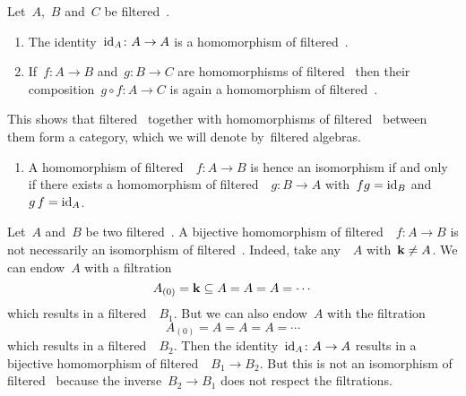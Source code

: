 \begin{remark}
  Let~$A$,~$B$ and~$C$ be filtered~\algebras{$\kf$}.
  \begin{enumerate}
    \item
      The identity~$\operatorname{id}_A \colon A \to A$ is a homomorphism of filtered~\algebras{$\kf$}.
    \item
      If~$f \colon A \to B$ and~$g \colon B \to C$ are homomorphisms of filtered~\algebras{$\kf$} then their composition~$g \circ f \colon A \to C$ is again a homomorphism of filtered~\algebras{$\kf$}.
  \end{enumerate}
  This shows that filtered~\algebras{$\kf$} together with homomorphisms of filtered~\algebras{$\kf$} between them form a category, which we will denote by~\gls*{filtered algebras}.
  \begin{enumerate}[resume]
    \item
      A homomorphism of filtered~{\algebras{$\kf$}}~$f \colon A \to B$ is hence an isomorphism if and only if there exists a homomorphism of filtered~{\algebras{$\kf$}}~$g \colon B \to A$ with~$f {} g = \operatorname{id}_B$ and~$g \, f = \operatorname{id}_A$.
  \end{enumerate}
\end{remark}


\begin{warning}
  Let~$A$ and~$B$ be two filtered~{\algebras{$\kf$}}.
  A bijective homomorphism of filtered~{\algebras{$\kf$}}~$f \colon A \to B$ is not necessarily an isomorphism of filtered~{\algebras{$\kf$}}.
  Indeed, take any~{\algebra{$\kf$}}~$A$ with~$\mathbf{k} \neq A$.
  We can endow~$A$ with a filtration
  \[
    A_{(0)}
    =
    \mathbf{k}
    \subseteq
    A
    =
    A
    =
    A
    =
    \dotsb
  \]
  which results in a filtered~{\algebra{$\kf$}}~$B_1$.
  But we can also endow~$A$ with the filtration
  \[
    A_{(0)}
    =
    A
    =
    A
    =
    A
    =
    \dotsb
  \]
  which results in a filtered~{\algebra{$\kf$}}~$B_2$.
  Then the identity~$\operatorname{id}_A \colon A \to A$  results in a bijective homomorphism of filtered~{\algebras{$\kf$}}~$B_1 \to B_2$.
  But this is not an isomorphism of filtered~{\algebras{$\kf$}} because the inverse~$B_2 \to B_1$ does not respect the filtrations.
\end{warning}


